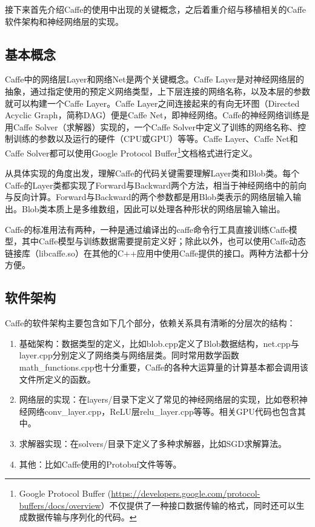 接下来首先介绍Caffe的使用中出现的关键概念，之后着重介绍与移植相关的Caffe软件架构和神经网络层的实现。

\subsection{基本概念}
Caffe中的网络层Layer和网络Net是两个关键概念。Caffe Layer是对神经网络层的抽象，通过指定使用的预定义网络类型，上下层连接的网络名称，以及本层的参数就可以构建一个Caffe Layer。Caffe Layer之间连接起来的有向无环图（Directed Acyclic Graph，简称DAG）便是Caffe Net，即神经网络。Caffe的神经网络训练是用Caffe Solver（求解器）实现的，一个Caffe Solver中定义了训练的网络名称、控制训练的参数以及运行的硬件（CPU或GPU）等等。Caffe Layer、Caffe Net和Caffe Solver都可以使用Google Protocol Buffer\footnote{Google Protocol Buffer (\url{https://developers.google.com/protocol-buffers/docs/overview}）不仅提供了一种接口数据传输的格式，同时还可以生成数据传输与序列化的代码。}文档格式进行定义。

从具体实现的角度出发，理解Caffe的代码关键需要理解Layer类和Blob类。每个Caffe的Layer类都实现了Forward与Backward两个方法，相当于神经网络中的前向与反向计算。Forward与Backward的两个参数都是用Blob类表示的网络层输入输出。Blob类本质上是多维数组，因此可以处理各种形状的网络层输入输出。

Caffe的标准用法有两种，一种是通过编译出的caffe命令行工具直接训练Caffe模型，其中Caffe模型与训练数据需要提前定义好；除此以外，也可以使用Caffe动态链接库（libcaffe.so）在其他的C++应用中使用Caffe提供的接口。两种方法都十分方便。

\subsection{软件架构}
Caffe的软件架构主要包含如下几个部分，依赖关系具有清晰的分层次的结构：
\begin{enumerate}
\item 基础架构：数据类型的定义，比如blob.cpp定义了Blob数据结构，net.cpp与layer.cpp分别定义了网络类与网络层类。同时常用数学函数math\_functions.cpp也十分重要，Caffe的各种大运算量的计算基本都会调用该文件所定义的函数。
\item 网络层的实现：在layers/目录下定义了常见的神经网络层的实现，比如卷积神经网络conv\_layer.cpp，ReLU层relu\_layer.cpp等等。相关GPU代码也包含其中。
\item 求解器实现：在solvers/目录下定义了多种求解器，比如SGD求解算法。
\item 其他：比如Caffe使用的Protobuf文件等等。
\end{enumerate}

